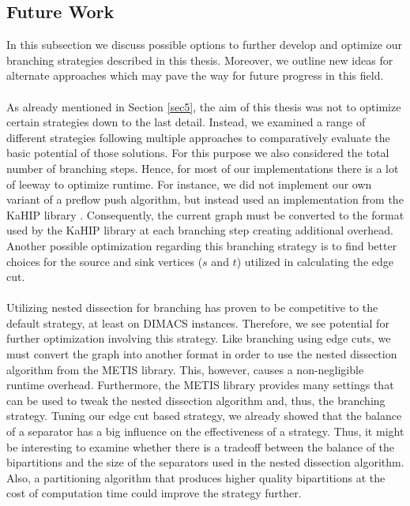 \documentclass[12pt,a4paper,twoside]{scrartcl}
\numberwithin{equation}{section}
\begin{document}
\subsection{Future Work} \label{sec7}
In this subsection we discuss possible options to further develop and optimize our branching strategies described in this thesis. Moreover, we outline new ideas for alternate approaches which may pave the way for future progress in this field.

\paragraph{}
As already mentioned in Section \ref{sec5}, the aim of this thesis was not to optimize certain strategies down to the last detail. Instead, we examined a range of different strategies following multiple approaches to comparatively evaluate the basic potential of those solutions. For this purpose we also considered the total number of branching steps. Hence, for most of our implementations there is a lot of leeway to optimize runtime. For instance, we did not implement our own variant of a preflow push algorithm, but instead used an implementation from the KaHIP library \cite{KAHIP}. Consequently, the current graph must be converted to the format used by the KaHIP library at each branching step creating additional overhead. Another possible optimization regarding this branching strategy is to find better choices for the source and sink vertices ($s$ and $t$) utilized in calculating the edge cut.  

\paragraph{}
Utilizing nested dissection for branching has proven to be competitive to the default strategy, at least on DIMACS instances. Therefore, we see potential for further optimization involving this strategy. Like branching using edge cuts, we must convert the graph into another format in order to use the nested dissection algorithm from the METIS library. This, however, causes a non-negligible runtime overhead. Furthermore, the METIS library provides many settings that can be used to tweak the nested dissection algorithm and, thus, the branching strategy. Tuning our edge cut based strategy, we already showed that the balance of a separator has a big influence on the effectiveness of a strategy. Thus, it might be interesting to examine whether there is a tradeoff between the balance of the bipartitions and the size of the separators used in the nested dissection algorithm. Also, a partitioning algorithm that produces higher quality bipartitions at the cost of computation time could improve the strategy further. 
\end{document}
